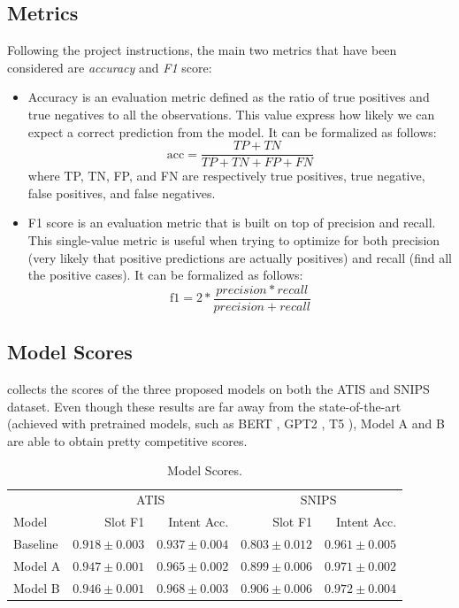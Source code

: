 \documentclass[a4paper]{article}
\begin{document}
\subsection{Metrics}
Following the project instructions, the main two metrics that have been considered are \emph{accuracy} and \emph{F1} score:
\begin{itemize}
    \item Accuracy is an evaluation metric defined as the ratio of true positives and true negatives to all the observations. This value express how likely we can expect a correct prediction from the model. It can be formalized as follows:
    \begin{equation*}
        \textrm{acc} = \frac{TP + TN}{TP + TN + FP + FN}
    \end{equation*}
    where TP, TN, FP, and FN are respectively true positives, true negative, false positives, and false negatives.
    \item F1 score is an evaluation metric that is built on top of precision and recall. This single-value metric is useful when trying to optimize for both precision (very likely that positive predictions are actually positives) and recall (find all the positive cases). It can be formalized as follows:
    \begin{equation*}
        \textrm{f1} = 2 * \frac{precision * recall}{precision + recall}
    \end{equation*}
\end{itemize}

\subsection{Model Scores}
 collects the scores of the three proposed models on both the ATIS and SNIPS dataset. Even though these results are far away from the state-of-the-art (achieved with pretrained models, such as BERT \cite{DBLP:journals/corr/abs-1810-04805}, GPT2 \cite{Radford2019LanguageMA}, T5 \cite{DBLP:journals/corr/abs-1910-10683}), Model A and B are able to obtain pretty competitive scores.

\begin{table}[!t]
    \centering
    \begin{tabular}{lrrrr}
        \toprule
            & \multicolumn{2}{c}{ATIS} & \multicolumn{2}{c}{SNIPS} \\
            Model & Slot F1  & Intent Acc. & Slot F1 & Intent Acc.\\
        \midrule
            Baseline & $0.918 \pm 0.003$ & $0.937 \pm 0.004$ & $0.803 \pm 0.012$ & $0.961 \pm 0.005$ \vspace{0.2cm}\\
            Model A & $\mathbf{0.947 \pm 0.001}$ & $0.965 \pm 0.002$ & $0.899 \pm 0.006$ & $0.971 \pm 0.002$ \vspace{0.2cm}\\
            Model B & $0.946 \pm 0.001$ & $\mathbf{0.968 \pm 0.003}$ & $\mathbf{0.906 \pm 0.006}$ & $\mathbf{0.972 \pm 0.004}$ \\
        \bottomrule
    \end{tabular}
    \caption{Model Scores.}
    \label{tab:model-score}
\end{table}
\end{document}
